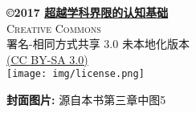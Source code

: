 	\AddToShipoutPicture*{\BackgroundPic}

	\begin{center}

	\end{center}

	\newpage
	\thispagestyle{empty}
	\phantom{hola!}

		
	\null
	\vfill
	\bc
		\begin{minipage}{0.65\textwidth}
			{\sffamily
				\bc
					\textbf{\copyright 2017 \href{http://toyhouse.cc/wiki/index.php/Seven_Brief_Lessons_on_Physics}{\textbf{超越学科界限的认知基础}}}\\
					\textsc{Creative Commons}\\

					署名-相同方式共享 3.0 未本地化版本\\
					\href{https://creativecommons.org/licenses/by-sa/3.0/legalcode}{(CC BY-SA 3.0)}\\[12pt]
					\texttt{[image: img/license.png]}\\[12pt]
				\ec
	
				\small\textbf{封面图片:} 源自本书第三章中图5
			}
		\end{minipage}\vspace*{1ex}

		
	\ec
